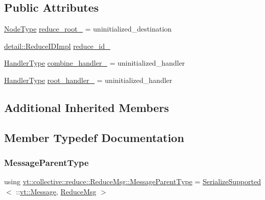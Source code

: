 \subsection*{Public Attributes}
\begin{DoxyCompactItemize}
\item 
\hyperlink{namespacevt_a866da9d0efc19c0a1ce79e9e492f47e2}{Node\+Type} \hyperlink{structvt_1_1collective_1_1reduce_1_1_reduce_msg_a976e38c6642d09d5f171aab8216df6b0}{reduce\+\_\+root\+\_\+} = uninitialized\+\_\+destination
\item 
\hyperlink{structvt_1_1collective_1_1reduce_1_1detail_1_1_reduce_i_d_impl}{detail\+::\+Reduce\+I\+D\+Impl} \hyperlink{structvt_1_1collective_1_1reduce_1_1_reduce_msg_a257abf9404c2c0cfa00625261b222540}{reduce\+\_\+id\+\_\+}
\item 
\hyperlink{namespacevt_af64846b57dfcaf104da3ef6967917573}{Handler\+Type} \hyperlink{structvt_1_1collective_1_1reduce_1_1_reduce_msg_a1265faa9b668a8668148a97f98b75d0d}{combine\+\_\+handler\+\_\+} = uninitialized\+\_\+handler
\item 
\hyperlink{namespacevt_af64846b57dfcaf104da3ef6967917573}{Handler\+Type} \hyperlink{structvt_1_1collective_1_1reduce_1_1_reduce_msg_a48c8f0668e71226396b6d7b09289fea1}{root\+\_\+handler\+\_\+} = uninitialized\+\_\+handler
\end{DoxyCompactItemize}
\subsection*{Additional Inherited Members}


\subsection{Member Typedef Documentation}
\mbox{\label{structvt_1_1collective_1_1reduce_1_1_reduce_msg_a5c736b83ddd821bdce047715e0b606f2}} 
\subsubsection{\texorpdfstring{Message\+Parent\+Type}{MessageParentType}}
{\footnotesize\ttfamily using \hyperlink{structvt_1_1collective_1_1reduce_1_1_reduce_msg_a5c736b83ddd821bdce047715e0b606f2}{vt\+::collective\+::reduce\+::\+Reduce\+Msg\+::\+Message\+Parent\+Type} =  \hyperlink{namespacevt_a3862b8e3f67ab03f3a4313d828592fa9}{Serialize\+Supported}$<$ \+::\hyperlink{namespacevt_a3a3ddfef40b4c90915fa43cdd5f129ea}{vt\+::\+Message}, \hyperlink{structvt_1_1collective_1_1reduce_1_1_reduce_msg}{Reduce\+Msg} $>$}



